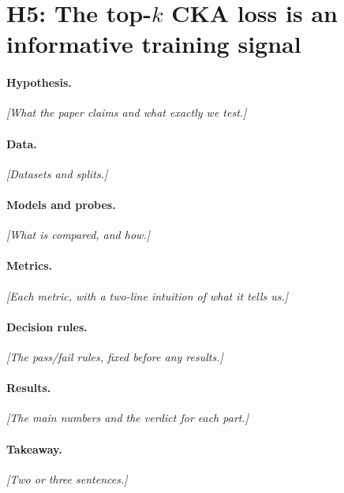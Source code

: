 \section{H5: The top-$k$ CKA loss is an informative training signal}
\label{sec:h5}

\paragraph{Hypothesis.}
\textit{[What the paper claims and what exactly we test.]}

\paragraph{Data.}
\textit{[Datasets and splits.]}

\paragraph{Models and probes.}
\textit{[What is compared, and how.]}

\paragraph{Metrics.}
\textit{[Each metric, with a two-line intuition of what it tells us.]}

\paragraph{Decision rules.}
\textit{[The pass/fail rules, fixed before any results.]}


\paragraph{Results.}
\textit{[The main numbers and the verdict for each part.]}

\paragraph{Takeaway.}
\textit{[Two or three sentences.]}
